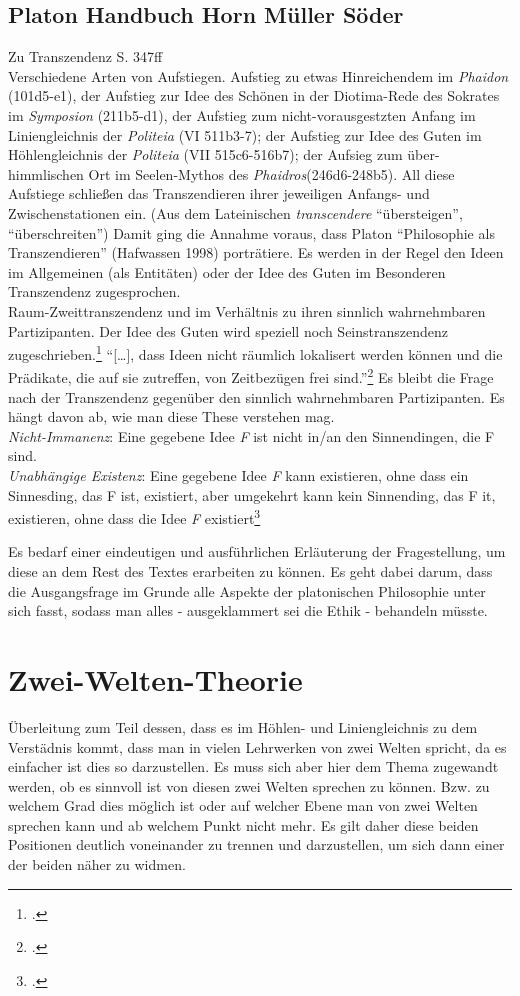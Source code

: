 \documentclass[12pt]{article}
\begin{document}
\subsection*{Platon Handbuch Horn Müller Söder}
Zu Transzendenz S. 347ff\\
Verschiedene Arten von Aufstiegen. Aufstieg zu etwas Hinreichendem im \emph{Phaidon} (101d5-e1), der Aufstieg zur Idee des Schönen in der Diotima-Rede des Sokrates im \emph{Symposion} (211b5-d1), der Aufstieg zum nicht-vorausgestzten Anfang im Liniengleichnis der \emph{Politeia} (VI 511b3-7); der Aufstieg zur Idee des Guten im Höhlengleichnis der \emph{Politeia} (VII 515c6-516b7); der Aufsieg zum über-himmlischen Ort im Seelen-Mythos des \emph{Phaidros}(246d6-248b5). All diese Aufstiege schließen das Transzendieren ihrer jeweiligen Anfangs- und Zwischenstationen ein. (Aus dem Lateinischen \emph{transcendere} \enquote{übersteigen}, \enquote{überschreiten}) 
Damit ging die Annahme voraus, dass Platon \enquote{Philosophie als Transzendieren} (Hafwassen 1998) porträtiere. 
Es werden in der Regel den Ideen im Allgemeinen (als Entitäten) oder der Idee des Guten im Besonderen Transzendenz zugesprochen.\\
Raum-Zweittranszendenz und im Verhältnis zu ihren sinnlich wahrnehmbaren Partizipanten. Der Idee des Guten wird speziell noch Seinstranszendenz zugeschrieben.\footcite[vgl.][S. 347]{StrobelTranszendenz}
\enquote{[\dots], dass Ideen nicht räumlich lokalisert werden können und die Prädikate, die auf sie zutreffen, von Zeitbezügen frei sind.}\footcite[vgl.][S. 347]{StrobelTranszendenz}
Es bleibt die Frage nach der Transzendenz gegenüber den sinnlich wahrnehmbaren Partizipanten. Es hängt davon ab, wie man diese These verstehen mag.\\
\emph{Nicht-Immanenz}: Eine gegebene Idee \emph{F} ist nicht in/an den Sinnendingen, die F sind.\\
\emph{Unabhängige Existenz}: Eine gegebene Idee \emph{F} kann existieren, ohne dass ein Sinnesding, das F ist, existiert, aber umgekehrt kann kein Sinnending, das F it, existieren, ohne dass die Idee \emph{F} existiert\footcite[][S.348]{StrobelTranszendenz}

Es bedarf einer eindeutigen und ausführlichen Erläuterung der Fragestellung, um diese an dem Rest des Textes erarbeiten zu können. Es geht dabei darum, dass die Ausgangsfrage im Grunde alle Aspekte der platonischen Philosophie unter sich fasst, sodass man alles - ausgeklammert sei die Ethik - behandeln müsste.
\section{Zwei-Welten-Theorie}
Überleitung zum Teil dessen, dass es im Höhlen- und Liniengleichnis zu dem Verstädnis kommt, dass man in vielen Lehrwerken von zwei Welten spricht, da es einfacher ist dies so darzustellen. Es muss sich aber hier dem Thema zugewandt werden, ob es sinnvoll ist von diesen zwei Welten sprechen zu können. Bzw. zu welchem Grad dies möglich ist oder auf welcher Ebene man von zwei Welten sprechen kann und ab welchem Punkt nicht mehr. Es gilt daher diese beiden Positionen deutlich voneinander zu trennen und darzustellen, um sich dann einer der beiden näher zu widmen.
\end{document}
